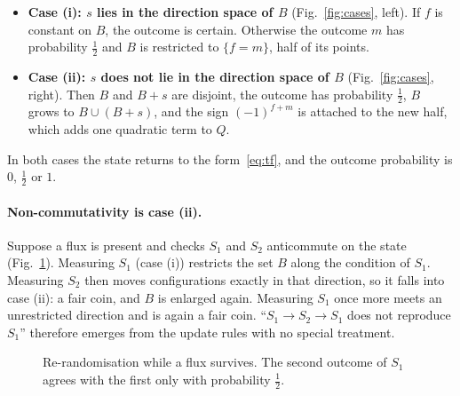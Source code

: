 \documentclass[11pt,a4paper]{article}
\begin{document}
\begin{itemize}
\item \textbf{Case (i): $s$ lies in the direction space of $B$} (Fig.~\ref{fig:cases}, left). If $f$ is constant on $B$, the outcome is certain. Otherwise the outcome $m$ has probability $\tfrac12$ and $B$ is restricted to $\{f=m\}$, half of its points.
\item \textbf{Case (ii): $s$ does not lie in the direction space of $B$} (Fig.~\ref{fig:cases}, right). Then $B$ and $B+s$ are disjoint, the outcome has probability $\tfrac12$, $B$ grows to $B\cup(B+s)$, and the sign $(-1)^{f+m}$ is attached to the new half, which adds one quadratic term to $Q$.
\end{itemize}
In both cases the state returns to the form~\eqref{eq:tf}, and the outcome probability is $0$, $\tfrac12$ or $1$.

\paragraph{Non-commutativity is case (ii).} Suppose a flux is present and checks $S_1$ and $S_2$ anticommute on the state (Fig.~\ref{fig:aba}). Measuring $S_1$ (case (i)) restricts the set $B$ along the condition of $S_1$. Measuring $S_2$ then moves configurations exactly in that direction, so it falls into case (ii): a fair coin, and $B$ is enlarged again. Measuring $S_1$ once more meets an unrestricted direction and is again a fair coin. ``$S_1\to S_2\to S_1$ does not reproduce $S_1$'' therefore emerges from the update rules with no special treatment.

\begin{figure}[t]
\centering
{}
\caption{Re-randomisation while a flux survives. The second outcome of $S_1$ agrees with the first only with probability $\tfrac12$.}
\label{fig:aba}
\end{figure}
\end{document}
